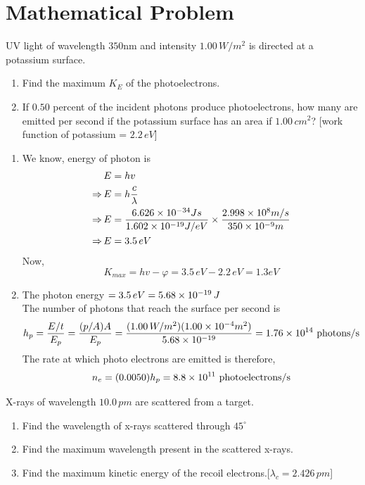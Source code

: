 \documentclass[../main.tex]{subfiles}
\begin{document}
    \section{Mathematical Problem}
    \begin{prob}
        UV light of wavelength $ 350 $nm and intensity $ 1.00\, W/m^2$ is directed at a potassium surface.
        \begin{enumerate}[label=(\alph*)]
            \item Find the maximum $ K_E $ of the photoelectrons.
            \item If $ 0.50 $ percent of the incident photons produce photoelectrons, how many are emitted per second if the potassium surface has an area if $ 1.00 \,cm^2 $? [work function of potassium = $ 2.2\,eV $]
        \end{enumerate}
    \end{prob}
    \begin{soln}
        \begin{enumerate}[label=(\alph*)]
            \item We know, energy of photon is
            \begin{align*}
                &E=hv\\
                \Rightarrow\,&E=h\frac{c}{\lambda}\\
                \Rightarrow\,&E=\frac{6.626\times 10^{-34} Js}{1.602\times 10^{-19}J/eV}\times\frac{2.998\times 10^{8}m/s}{350\times 10^{-9}m}\\
                \Rightarrow\,&E=3.5 \,eV
            \end{align*}
            Now,
            \[
                K_{max}=hv-\varphi=3.5\,eV-2.2\,eV=1.3eV
            \]
            \item The photon energy $ =3.5\,eV=5.68\times 10^{-19}\,J $\\
            The number of photons that reach the surface per second is 
            \[
                h_p=\frac{E/t}{E_p}=\frac{(p/A)A}{E_p}=\frac{(1.00\,W/m^2)(1.00\times 10^{-4}m^2)}{5.68\times 10^{-19}}=1.76\times 10^{14}\text{ photons/s}
            \]
            The rate at which photo electrons are emitted is therefore,
            \[n_e=(0.0050)h_p=8.8\times 10^{11}\text{ photoelectrons/s}\]
        \end{enumerate}
    \end{soln}
    \begin{prob}
        X-rays of wavelength $ 10.0\,pm $ are scattered from a target.
        \begin{enumerate}[label=(\alph*)]
            \item Find the wavelength of x-rays scattered through $ 45^\circ $
            \item Find the maximum wavelength present in the scattered x-rays.
            \item Find the maximum kinetic energy of the recoil electrons.[$ \lambda_c=2.426\,pm $]
        \end{enumerate}
    \end{prob}
\end{document}
